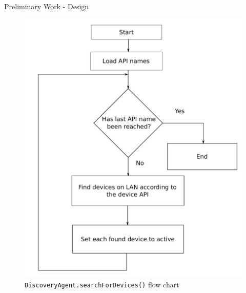 \documentclass{beamer}
\begin{document}
\begin{frame}{Preliminary Work - Design}{}
    \begin{figure}
        \centering
        \includegraphics[scale=0.3]{figs/searchForDevicesFlow.pdf}
        \caption{\texttt{DiscoveryAgent.searchForDevices()} flow chart}
        \label{fig:searchForDevicesFlow}
    \end{figure}
\end{frame}
\end{document}
